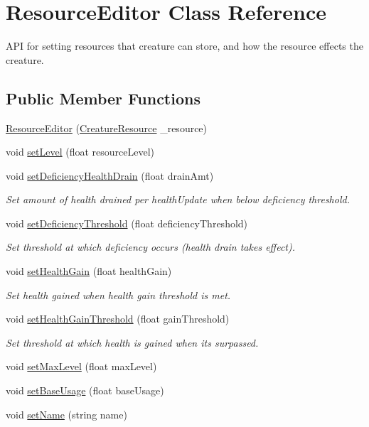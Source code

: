 \hypertarget{class_resource_editor}{}\section{Resource\+Editor Class Reference}
\label{class_resource_editor}


A\+PI for setting resources that creature can store, and how the resource effects the creature.  


\subsection*{Public Member Functions}
\begin{DoxyCompactItemize}
\item 
\mbox{\hyperlink{class_resource_editor_a928faf6be8a59c7145e47948bcfeeeb2}{Resource\+Editor}} (\mbox{\hyperlink{class_creature_resource}{Creature\+Resource}} \+\_\+resource)
\item 
void \mbox{\hyperlink{class_resource_editor_a123d8260cfbc18a439e5e222ec1c101e}{set\+Level}} (float resource\+Level)
\item 
void \mbox{\hyperlink{class_resource_editor_a7b6f57a8791a396d56a2d08cea1db14b}{set\+Deficiency\+Health\+Drain}} (float drain\+Amt)
\begin{DoxyCompactList}\small\item\em Set amount of health drained per health\+Update when below deficiency threshold. \end{DoxyCompactList}\item 
void \mbox{\hyperlink{class_resource_editor_a98153dea69b0e350ae2ac75bf328891c}{set\+Deficiency\+Threshold}} (float deficiency\+Threshold)
\begin{DoxyCompactList}\small\item\em Set threshold at which deficiency occurs (health drain takes effect). \end{DoxyCompactList}\item 
void \mbox{\hyperlink{class_resource_editor_a4865f27f5f791455a7c4aa885be706a8}{set\+Health\+Gain}} (float health\+Gain)
\begin{DoxyCompactList}\small\item\em Set health gained when health gain threshold is met. \end{DoxyCompactList}\item 
void \mbox{\hyperlink{class_resource_editor_ac3d8fea68de6b8141fa6c777bb192590}{set\+Health\+Gain\+Threshold}} (float gain\+Threshold)
\begin{DoxyCompactList}\small\item\em Set threshold at which health is gained when it\textquotesingle{}s surpassed. \end{DoxyCompactList}\item 
void \mbox{\hyperlink{class_resource_editor_ac6807f97759768dfbf00a4517e46907d}{set\+Max\+Level}} (float max\+Level)
\item 
void \mbox{\hyperlink{class_resource_editor_afcd49279ce6e7d4c886dea66fcbe6d55}{set\+Base\+Usage}} (float base\+Usage)
\item 
void \mbox{\hyperlink{class_resource_editor_ae0558c83ceec579e083cf02d1a8e698e}{set\+Name}} (string name)
\end{DoxyCompactItemize}
